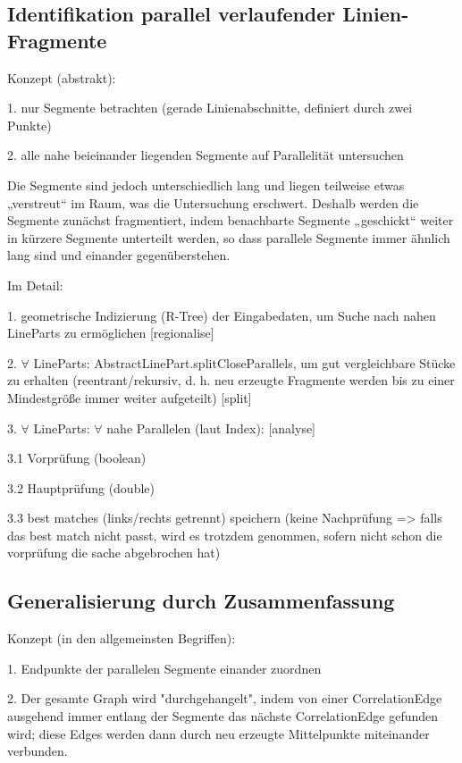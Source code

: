 \documentclass[../main/thesis.tex]{subfiles}
\begin{document}
\subsection{Identifikation parallel verlaufender Linien-Fragmente}

Konzept (abstrakt):

1. nur Segmente betrachten (gerade Linienabschnitte, definiert durch zwei Punkte)

2. alle nahe beieinander liegenden Segmente auf Parallelität untersuchen

Die Segmente sind jedoch unterschiedlich lang und liegen teilweise etwas „verstreut“ im Raum, was die Untersuchung erschwert.
Deshalb werden die Segmente zunächst fragmentiert, indem benachbarte Segmente „geschickt“ weiter in kürzere Segmente unterteilt werden, so dass parallele Segmente immer ähnlich lang sind und einander gegenüberstehen.

Im Detail:

1. geometrische Indizierung (R-Tree) der Eingabedaten, um Suche nach nahen LineParts zu ermöglichen [regionalise]

2. $\forall$ LineParts: AbstractLinePart.splitCloseParallels, um gut vergleichbare Stücke zu erhalten (reentrant/rekursiv, d. h. neu erzeugte Fragmente werden bis zu einer Mindestgröße immer weiter aufgeteilt) [split]

3. $\forall$ LineParts: $\forall$ nahe Parallelen (laut Index): [analyse]

3.1 Vorprüfung (boolean)

3.2 Hauptprüfung (double)

3.3 best matches (links/rechts getrennt) speichern (keine Nachprüfung => falls das best match nicht passt, wird es trotzdem genommen, sofern nicht schon die vorprüfung die sache abgebrochen hat)



\subsection{Generalisierung durch Zusammenfassung}

Konzept (in den allgemeinsten Begriffen):

1. Endpunkte der parallelen Segmente einander zuordnen

2. Der gesamte Graph wird "durchgehangelt", indem von einer CorrelationEdge ausgehend immer entlang der Segmente das nächste CorrelationEdge gefunden wird; diese Edges werden dann durch neu erzeugte Mittelpunkte miteinander verbunden.
\end{document}
